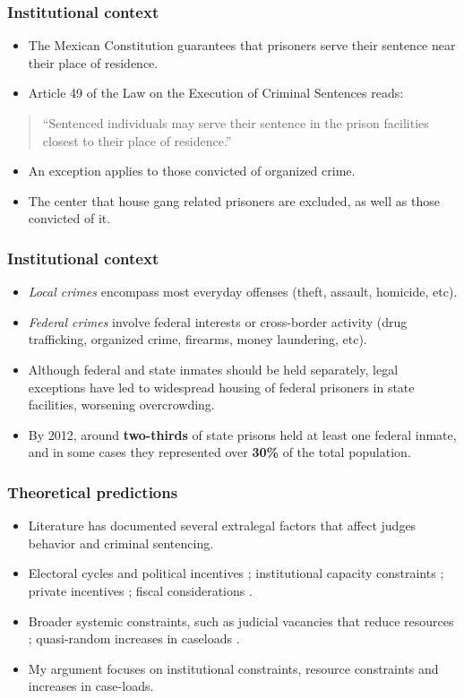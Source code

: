 \documentclass[12pt]{beamer}
\begin{document}
\begin{frame}
\frametitle{Institutional context}
\small
\begin{itemize}
    \item The Mexican Constitution guarantees that prisoners serve their sentence near their place of residence.
    \item Article 49 of the Law on the Execution of Criminal Sentences reads:
    \end{itemize}
    \begin{quote}
    \centering
``Sentenced individuals may serve their sentence in the prison facilities closest to their place
 of residence.''
\end{quote}
\begin{itemize}
    \item An exception applies to those convicted of organized crime.
    \item The center that house gang related prisoners are excluded, as well as those convicted of it.
\end{itemize}
\end{frame}

\begin{frame}
\frametitle{Institutional context}
\small
\begin{itemize}
    \item \textit{Local crimes} encompass most everyday offenses (theft, assault, homicide, etc). 
    \item \textit{Federal crimes} involve federal interests or cross-border activity (drug trafficking, organized crime, firearms, money laundering, etc).
    \item Although federal and state inmates should be held separately, legal exceptions have led to widespread housing of federal prisoners in state facilities, worsening overcrowding.  
    \item By 2012, around \textbf{two-thirds} of state prisons held at least one federal inmate, and in some cases they represented over \textbf{30\% } of the total population.  
\end{itemize}
\end{frame}

\begin{frame}
\frametitle{Theoretical predictions}
\small
\begin{itemize}
    \item Literature has documented several extralegal factors that affect judges behavior and criminal sentencing. 
    \item Electoral cycles and political incentives \citep{Gordon-Judges-Election}; institutional capacity constraints \citep{Schnepel}; private incentives \citep{Dippel}; fiscal considerations \citep{Ouss-Incentives}.
    \item Broader systemic constraints, such as judicial vacancies that reduce resources \citep{Yang-Resource-AEJ}; quasi-random increases in caseloads \citep{JudgeCaseloads-JPE-Shumway}.
    \item My argument focuses on institutional constraints, resource constraints and increases in case-loads.
\end{itemize}
\end{frame}
\end{document}
